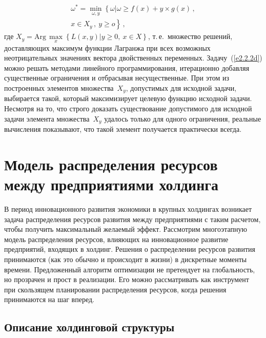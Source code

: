 \begin{multicols}{2}
\noindent
     \begin{multline}
     \omega^*=\underset{\omega,y}{\min}\left\{\omega\vert\omega\geq 
f(x)+y\times g(x)\,,\right. \\[-2pt]
\left. x\in X_y\,, \ y\geq o\right \}\,,
     \label{e2.2.2d}
     \end{multline}
где $X_y=\mathrm{Arg}\, \underset{x}{\max}\left\{ L(x,y)\vert y\geq 0,\ x\in X\right \}$, 
т.\,е.\ множество решений, доставляющих максимум функции Лагранжа при 
всех возможных неотрицательных значениях вектора двойственных 
переменных. Задачу~(\ref{e2.2.2d}) можно решать методами линейного 
программирования, итерационно добавляя существенные ограничения и 
отбрасывая несущественные. При этом из построенных элементов 
множества~$X_y$, допустимых для исходной задачи, выбирается такой, 
который максимизирует целевую функцию исходной задачи. Несмотря на то,
что строго доказать существование допустимого для исходной задачи 
элемента множества~$X_y$ удалось только для одного ограничения, 
реальные вычисления показывают, что такой элемент получается 
практически всегда.

\vspace*{-5pt}

\section{Модель распределения ресурсов между предприятиями 
холдинга}

\vspace*{-3pt}
     
     В период инновационного развития экономики в крупных холдингах 
возникает задача распределения ресурсов развития между предприятиями с 
таким расчетом, чтобы получить максимальный желаемый эффект. 
Рассмотрим многоэтапную модель распределения ресурсов, влияющих на 
инновационное развитие предприятий, входящих в холдинг. Решения о 
распределении ресурсов развития принимаются (как это обычно и 
происходит в жизни) в дискретные моменты времени. Предложенный 
алгоритм оптимизации не претендует на глобальность, но прозрачен и прост 
в реализации. Его можно рассматривать как инструмент при скользящем 
планировании распределения ресурсов, когда решения принимаются на шаг 
вперед.
     
     
     \vspace*{-4pt}
     
\subsection{Описание холдинговой структуры} %


\end{multicols}
